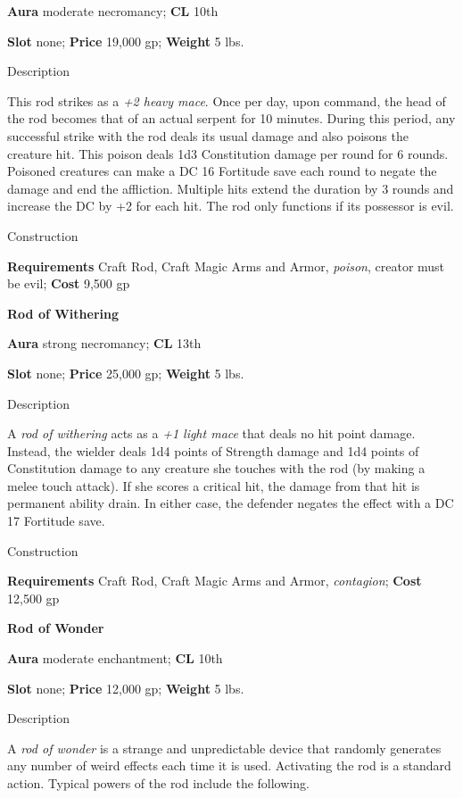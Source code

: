 \textbf{Aura} moderate necromancy;\textbf{ CL }10th
				
\textbf{Slot} none; \textbf{Price} 19,000 gp; \textbf{Weight} 5 lbs.
				
Description
				
This rod strikes as a \textit{+2 heavy mace}. Once per day, upon command, the head of the rod becomes that of an actual serpent for 10 minutes. During this period, any successful strike with the rod deals its usual damage 
and also
 poisons the creature hit. This poison deals 1d3 Constitution damage per round for 6 rounds. Poisoned creatures can make a DC 16 Fortitude save each round to negate the damage and end the affliction. Multiple hits extend the duration by 3 rounds and increase the DC by +2 for each hit. The rod only functions if its possessor is evil. 
				
Construction
				
\textbf{Requirements} Craft Rod, Craft Magic Arms and Armor, \textit{poison}, creator must be evil; \textbf{Cost }9,500 gp
				
\textbf{Rod of Withering}
				
\textbf{Aura} strong necromancy;\textbf{ CL }13th
				
\textbf{Slot} none; \textbf{Price} 25,000 gp; \textbf{Weight} 5 lbs.
				
Description
				
A \textit{rod of withering }acts as a \textit{+1 light mace }that deals no hit point damage. Instead, the wielder deals 1d4 points of Strength damage and 1d4 points of Constitution damage to any creature she touches with the rod (by making a melee touch attack). If she scores a critical hit, the damage from that hit is permanent ability drain. In either case, the defender negates the effect with a DC 17 Fortitude save. 
				
Construction
				
\textbf{Requirements} Craft Rod, Craft Magic Arms and Armor, \textit{contagion}; \textbf{Cost }12,500 gp
				
\textbf{Rod of Wonder}
				
\textbf{Aura} moderate enchantment;\textbf{ CL }10th
				
\textbf{Slot} none; \textbf{Price} 12,000 gp; \textbf{Weight} 5 lbs.
				
Description
				
A \textit{rod of wonder }is a strange and unpredictable device that randomly generates any number of weird effects each time it is used. Activating the rod is a standard action. Typical powers of the rod include the following.

